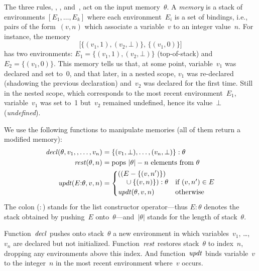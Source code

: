 The three rules, , , and~, act on the input
memory~$\theta$.  A \emph{memory} is a stack of environments
$[E_1,\dots,E_k]$ where each environment~$E_i$ is a set of bindings, i.e.,
pairs of the form~$(v,n)$ which associate a variable~$v$ to an integer
value~$n$.  For instance, the memory
\[
  \big[\{(v_1,1),(v_2,\bot)\},\,\{(v_1,0)\}\big]
\]
has two environments: $E_1=\{(v_1,1),(v_2,\bot)\}$ (top-of-stack)
and~$E_2=\{(v_1,0)\}$.  This memory tells us that, at some point,
variable~$v_1$ was declared and set to~0, and that later, in a nested scope,
$v_1$ was re-declared (shadowing the previous declaration) and~$v_2$ was
declared for the first time.  Still in the nested scope, which corresponds
to the most recent environment~$E_1$, variable~$v_1$ was set to~1 but~$v_2$
remained undefined, hence its value~$\bot$ (\emph{undefined}).

\strut{}


We use the following functions to manipulate memories (all of them return a
modified memory):
\begin{align*}
  \memdecl(\theta,v_1,,\dots,v_n)
  &=\{(v_1,\bot),\dots,(v_n,\bot)\}:\theta\\
  \memrest(\theta,n)
  &=\text{pops $\left|\theta\right|-n$ elements from~$\theta$}\\
  \memupdt(E{:}\theta,v,n)
  &=\begin{cases}
    \begin{aligned}[b]
      &((E-\{(v,n')\})\\
      &\quad\null\cup\{(v,n)\}):\theta
    \end{aligned}
    &\text{if~$(v,n')\in{E}$}\\
    \memupdt(\theta,v,n)
    &\text{otherwise}
  \end{cases}
\end{align*}
The colon ($:$) stands for the list constructor operator---thus $E{:}\theta$
denotes the stack obtained by pushing~$E$
onto~$\theta$---and~$\left|\theta\right|$ stands for the length of
stack~$\theta$.

Function~$\mathop{\mathit{decl}}$ pushes onto stack~$\theta$ a new environment in which
variables~$v_1$, \dots, $v_n$ are declared but not initialized.
Function~$\mathop{\mathit{rest}}$ restores stack~$\theta$ to index~$n$, dropping any
environments above this index.  And function~$\mathop{\mathit{updt}}$ binds variable~$v$
to the integer~$n$ in the most recent environment where~$v$ occurs.


